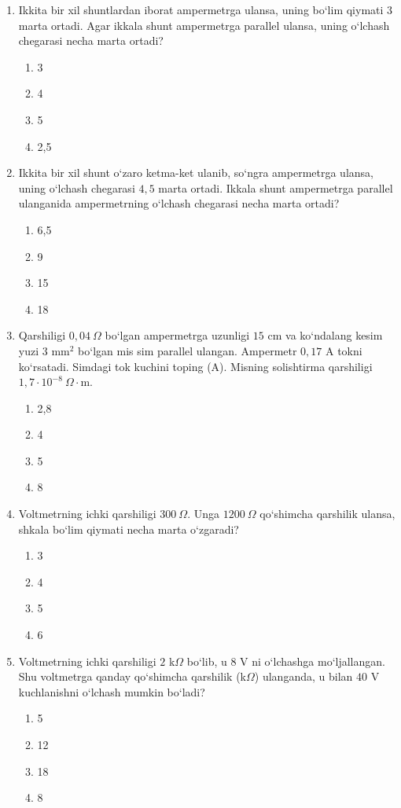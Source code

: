 \begin{enumerate}
\item Ikkita bir xil shuntlardan iborat ampermetrga ulansa, uning bo‘lim qiymati $3$ marta ortadi. Agar ikkala shunt ampermetrga parallel ulansa, uning o‘lchash chegarasi necha marta ortadi?
\begin{enumerate}[label=\Alph*)]
\item 3
\item 4
\item 5
\item 2,5
\end{enumerate}

\item Ikkita bir xil shunt o‘zaro ketma-ket ulanib, so‘ngra ampermetrga ulansa, uning o‘lchash chegarasi $4,5$ marta ortadi. Ikkala shunt ampermetrga parallel ulanganida ampermetrning o‘lchash chegarasi necha marta ortadi?
\begin{enumerate}[label=\Alph*)]
\item 6,5
\item 9
\item 15
\item 18
\end{enumerate}

\item Qarshiligi $0,04~\Omega$ bo‘lgan ampermetrga uzunligi $15$ cm va ko‘ndalang kesim yuzi $3$ mm$^2$ bo‘lgan mis sim parallel ulangan. Ampermetr $0,17$ A tokni ko‘rsatadi. Simdagi tok kuchini toping (A). Misning solishtirma qarshiligi $1,7\cdot10^{-8}~\Omega\cdot$m.
\begin{enumerate}[label=\Alph*)]
\item 2,8
\item 4
\item 5
\item 8
\end{enumerate}

\item Voltmetrning ichki qarshiligi $300~\Omega$. Unga $1200~\Omega$ qo‘shimcha qarshilik ulansa, shkala bo‘lim qiymati necha marta o‘zgaradi?
\begin{enumerate}[label=\Alph*)]
\item 3
\item 4
\item 5
\item 6
\end{enumerate}

\item Voltmetrning ichki qarshiligi $2$ k$\Omega$ bo‘lib, u $8$ V ni o‘lchashga mo‘ljallangan. Shu voltmetrga qanday qo‘shimcha qarshilik (k$\Omega$) ulanganda, u bilan $40$ V kuchlanishni o‘lchash mumkin bo‘ladi?
\begin{enumerate}[label=\Alph*)]
\item 5
\item 12
\item 18
\item 8
\end{enumerate}


\end{enumerate}

